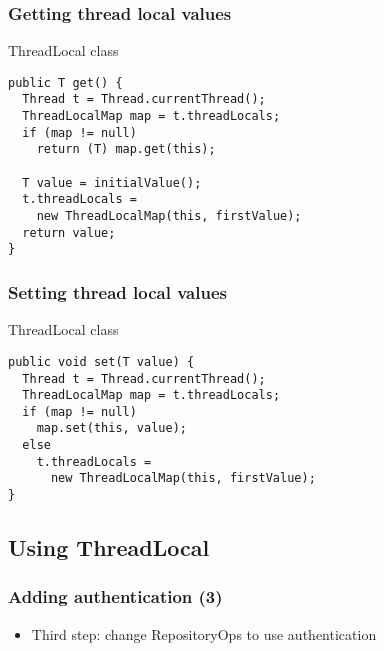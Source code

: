 \documentclass{beamer}
\begin{document}
\begin{frame}[fragile]
  \frametitle{Getting thread local values}

\begin{block}{ThreadLocal class}
\begin{verbatim}
public T get() {
  Thread t = Thread.currentThread();
  ThreadLocalMap map = t.threadLocals;
  if (map != null)
    return (T) map.get(this);

  T value = initialValue();
  t.threadLocals =
    new ThreadLocalMap(this, firstValue);
  return value;
}
\end{verbatim}
\end{block}

\end{frame}

\begin{frame}[fragile]
  \frametitle{Setting thread local values}

\begin{block}{ThreadLocal class}
\begin{verbatim}
public void set(T value) {
  Thread t = Thread.currentThread();
  ThreadLocalMap map = t.threadLocals;
  if (map != null)
    map.set(this, value);
  else
    t.threadLocals =
      new ThreadLocalMap(this, firstValue);
}
\end{verbatim}
\end{block}

\end{frame}

\subsection{Using ThreadLocal}

\begin{frame}
  \frametitle{Adding authentication (3)}

\begin{itemize}
\item Third step: change RepositoryOps to use authentication
\end{itemize}

\end{frame}
\end{document}
